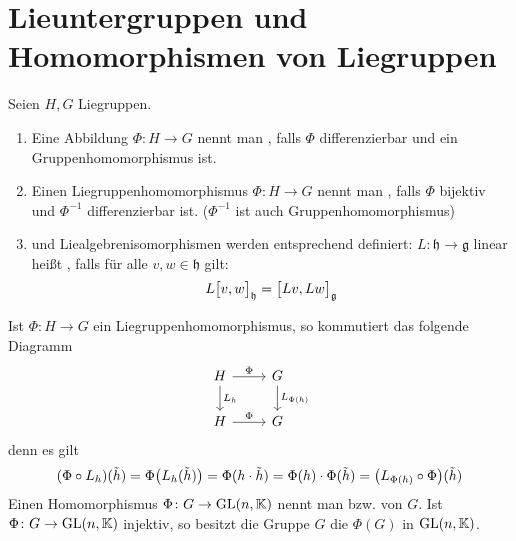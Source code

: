 \section{Lieuntergruppen und Homomorphismen von Liegruppen} %
\label{sec:12}

\begin{definition}[{name=[Liegruppen- und Liealgebrenhomomorphismen]}]
	Seien $H,G$ Liegruppen.
	\begin{enumerate}[1)]
		\item Eine Abbildung $\Phi \colon H \to G$ nennt man , falls $\Phi$ differenzierbar und ein Gruppenhomomorphismus ist.
		\item Einen Liegruppenhomomorphismus $\Phi \colon H \to G$ nennt man , falls $\Phi$ bijektiv und $\Phi^{-1}$ differenzierbar ist. ($\Phi^{-1}$ ist auch Gruppenhomomorphismus)
		\item {} und Liealgebrenisomorphismen werden entsprechend definiert:  $L \colon \mathfrak{h} \to \mathfrak{g}$ linear heißt , falls für alle $v,w \in \mathfrak{h}$ gilt:
		\[
			L \benbrace[\big]{v,w}_{\mathfrak{h}} = \benbrace[\big]{L v, L w}_\mathfrak{g}
		\]
	\end{enumerate}
\end{definition}

Ist $\Phi \colon H \to G$ ein Liegruppenhomomorphismus, so kommutiert das folgende Diagramm
\[
	\begin{tikzcd}
		H \rar["\Phi"] \dar["L_h"] & G \dar["L_{\Phi(h)}"] \\
		H \rar["\Phi"] & G
	\end{tikzcd}
\]
denn es gilt
\begin{align}
	(\Phi \circ L_h)(\tilde{h}) = \Phi \enbrace*{L_h(\tilde{h})} = \Phi(h \cdot \tilde{h}) = \Phi(h) \cdot \Phi(\tilde{h}) = \enbrace*{L_{\Phi(h)} \circ \Phi}(\tilde{h})
\end{align}
Einen Homomorphismus $\Phi \colon G \to \GL(n,\mathbb{K})$ nennt man  bzw.  von $G$.
Ist $\Phi \colon G \to \GL(n,\mathbb{K})$ injektiv, so besitzt die Gruppe $G$ die  $\Phi(G)$ in $\GL(n,\mathbb{K})$.

